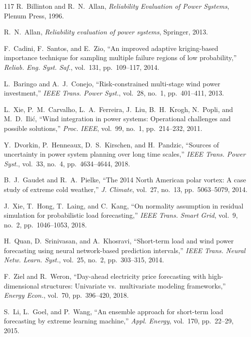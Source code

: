 \documentclass[12pt,a4paper]{article}
\begin{document}
\begin{thebibliography}{117}
 R.~Billinton and R.~N.~Allan, \textit{Reliability Evaluation of Power Systems}, Plenum Press, 1996.

 R.~N.~Allan, \textit{Reliability evaluation of power systems}, Springer, 2013.

 F.~Cadini, F.~Santos, and E.~Zio, ``An improved adaptive kriging-based importance technique for sampling multiple failure regions of low probability,'' \textit{Reliab. Eng. Syst. Saf.}, vol.~131, pp.~109--117, 2014.

 L.~Baringo and A.~J.~Conejo, ``Risk-constrained multi-stage wind power investment,'' \textit{IEEE Trans. Power Syst.}, vol.~28, no.~1, pp.~401--411, 2013.

 L.~Xie, P.~M.~Carvalho, L.~A.~Ferreira, J.~Liu, B.~H.~Krogh, N.~Popli, and M.~D.~Ili\'{c}, ``Wind integration in power systems: Operational challenges and possible solutions,'' \textit{Proc. IEEE}, vol.~99, no.~1, pp.~214--232, 2011.

 Y.~Dvorkin, P.~Henneaux, D.~S.~Kirschen, and H.~Pandzic, ``Sources of uncertainty in power system planning over long time scales,'' \textit{IEEE Trans. Power Syst.}, vol.~33, no.~4, pp.~4634--4644, 2018.

 B.~J.~Gaudet and R.~A.~Pielke, ``The 2014 North American polar vortex: A case study of extreme cold weather,'' \textit{J. Climate}, vol.~27, no.~13, pp.~5063--5079, 2014.

 J.~Xie, T.~Hong, T.~Laing, and C.~Kang, ``On normality assumption in residual simulation for probabilistic load forecasting,'' \textit{IEEE Trans. Smart Grid}, vol.~9, no.~2, pp.~1046--1053, 2018.

 H.~Quan, D.~Srinivasan, and A.~Khosravi, ``Short-term load and wind power forecasting using neural network-based prediction intervals,'' \textit{IEEE Trans. Neural Netw. Learn. Syst.}, vol.~25, no.~2, pp.~303--315, 2014.

 F.~Ziel and R.~Weron, ``Day-ahead electricity price forecasting with high-dimensional structures: Univariate vs.\ multivariate modeling frameworks,'' \textit{Energy Econ.}, vol.~70, pp.~396--420, 2018.

 S.~Li, L.~Goel, and P.~Wang, ``An ensemble approach for short-term load forecasting by extreme learning machine,'' \textit{Appl. Energy}, vol.~170, pp.~22--29, 2015.


\end{thebibliography}
\end{document}
